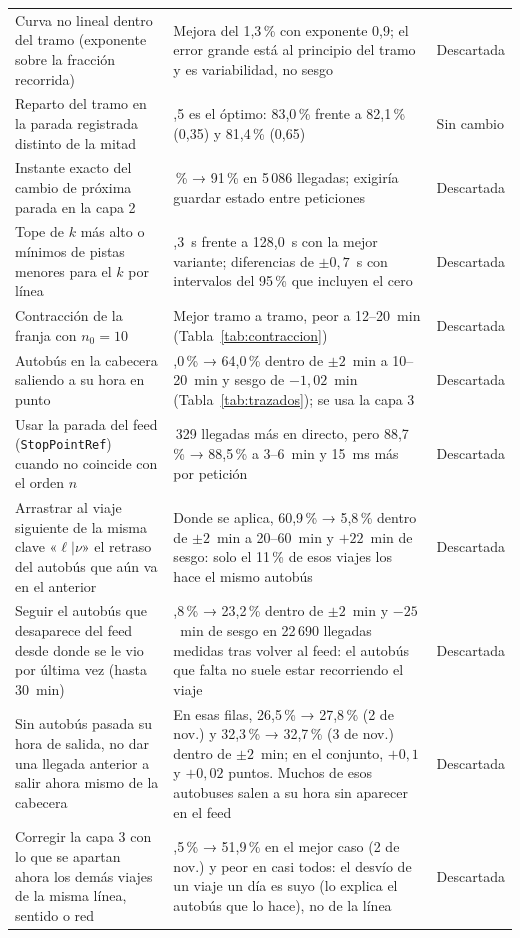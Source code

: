 \begin{longtable}{@{}>{\raggedright\arraybackslash}p{}>{\raggedright\arraybackslash}p{}>{\raggedright\arraybackslash}p{}@{}}
Curva no lineal dentro del tramo (exponente sobre la fracción recorrida) & Mejora del 1,3\,\% con exponente 0,9; el error grande está al principio del tramo y es variabilidad, no sesgo & Descartada\\
Reparto del tramo en la parada registrada distinto de la mitad & 0,5 es el óptimo: 83,0\,\% frente a 82,1\,\% (0,35) y 81,4\,\% (0,65) & Sin cambio\\
Instante exacto del cambio de próxima parada en la capa 2 & 91\,\% → 91\,\% en 5\,086 llegadas; exigiría guardar estado entre peticiones & Descartada\\
Tope de $k$ más alto o mínimos de pistas menores para el $k$ por línea & 128,3~s frente a 128,0~s con la mejor variante; diferencias de $\pm0{,}7$~s con intervalos del 95\,\% que incluyen el cero & Descartada\\
Contracción de la franja con $n_0=10$ & Mejor tramo a tramo, peor a 12--20~min (Tabla~\ref{tab:contraccion}) & Descartada\\
Autobús en la cabecera saliendo a su hora en punto & 67,0\,\% → 64,0\,\% dentro de $\pm2$~min a 10--20~min y sesgo de $-1{,}02$~min (Tabla~\ref{tab:trazados}); se usa la capa 3 & Descartada\\
Usar la parada del feed (\texttt{StopPointRef}) cuando no coincide con el orden $n$ & 2\,329 llegadas más en directo, pero 88,7\,\% → 88,5\,\% a 3--6~min y 15~ms más por petición & Descartada\\
Arrastrar al viaje siguiente de la misma clave «$\ell|\nu$» el retraso del autobús que aún va en el anterior & Donde se aplica, 60,9\,\% → 5,8\,\% dentro de $\pm2$~min a 20--60~min y $+22$~min de sesgo: solo el 11\,\% de esos viajes los hace el mismo autobús & Descartada\\
Seguir el autobús que desaparece del feed desde donde se le vio por última vez (hasta 30~min) & 39,8\,\% → 23,2\,\% dentro de $\pm2$~min y $-25$~min de sesgo en 22\,690 llegadas medidas tras volver al feed: el autobús que falta no suele estar recorriendo el viaje & Descartada\\
Sin autobús pasada su hora de salida, no dar una llegada anterior a salir ahora mismo de la cabecera & En esas filas, 26,5\,\% → 27,8\,\% (2 de nov.) y 32,3\,\% → 32,7\,\% (3 de nov.) dentro de $\pm2$~min; en el conjunto, $+0{,}1$ y $+0{,}02$ puntos. Muchos de esos autobuses salen a su hora sin aparecer en el feed & Descartada\\
Corregir la capa 3 con lo que se apartan ahora los demás viajes de la misma línea, sentido o red & 51,5\,\% → 51,9\,\% en el mejor caso (2 de nov.) y peor en casi todos: el desvío de un viaje un día es suyo (lo explica el autobús que lo hace), no de la línea & Descartada\\
\end{longtable}

